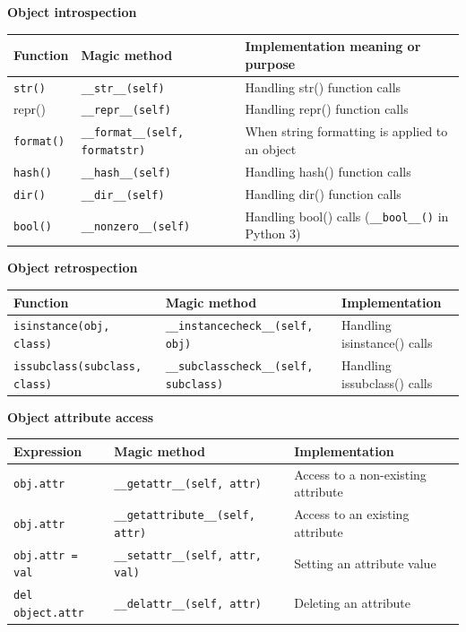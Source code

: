 \textbf{Object introspection}\\[0.1cm]
\begin{tabular}{|p{2cm}|p{5.5cm}|p{7.5cm}|}
\hline
\textbf{Function} & \textbf{Magic method} & \textbf{Implementation meaning or purpose} \\
\hline
\texttt{str()} & \texttt{\_\_str\_\_(self)} & Handling str() function calls \\
repr() & \texttt{\_\_repr\_\_(self)} & Handling repr() function calls \\
\texttt{format()} & \texttt{\_\_format\_\_(self, formatstr)} & When string formatting is applied to an object \\
\texttt{hash()} & \texttt{\_\_hash\_\_(self)} & Handling hash() function calls \\
\texttt{dir()} & \texttt{\_\_dir\_\_(self)} & Handling dir() function calls \\
\texttt{bool()} & \texttt{\_\_nonzero\_\_(self)} & Handling bool() calls (\texttt{\_\_bool\_\_()} in Python 3)
 \\
\hline
\end{tabular}

\vspace{0.5cm}

\textbf{Object retrospection}\\[0.1cm]
\begin{tabular}{|p{4.5cm}|p{6cm}|p{4.5cm}|}
\hline
\textbf{Function} & \textbf{Magic method} & \textbf{Implementation} \\
\hline
\texttt{isinstance(obj, class)} & \texttt{\_\_instancecheck\_\_(self, obj)} & Handling isinstance() calls \\
\texttt{issubclass(subclass, class)} & \texttt{\_\_subclasscheck\_\_(self, subclass)} & Handling issubclass() calls \\
\hline
\end{tabular}

\vspace{0.5cm}

\textbf{Object attribute access}\\[0.1cm]
\begin{tabular}{|p{3.5cm}|p{6cm}|p{5.5cm}|}
\hline
\textbf{Expression} & \textbf{Magic method} & \textbf{Implementation} \\
\hline
\texttt{obj.attr} & \texttt{\_\_getattr\_\_(self, attr)} & Access to a non-existing attribute \\
\texttt{obj.attr} & \texttt{\_\_getattribute\_\_(self, attr)} & Access to an existing attribute \\
\texttt{obj.attr = val} & \texttt{\_\_setattr\_\_(self, attr, val)} & Setting an attribute value \\
\texttt{del object.attr} & \texttt{\_\_delattr\_\_(self, attr)} & Deleting an attribute \\
\hline
\end{tabular}

